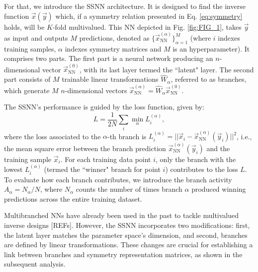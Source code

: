 
For that, we introduce the SSNN architecture. It is designed to find the inverse function $\vec{x} (\vec{y})$ which, if a symmetry relation presented in Eq. \eqref{eq:symmetry} holds, will be $K$-fold multivalued. This NN depicted in Fig. \ref{fig:FIG_1}, takes $\vec{y}$ as input and outputs $M$ predictions, denoted as $\{ \vec{x}^{(\alpha)}_{\mathrm{NN}} \}_{\alpha=1}^{M}$ (where $i$ indexes training samples, $\alpha$ indexes symmetry matrices and $M$ is an hyperparameter). It comprises two parts. The first part is a neural network producing an $n$-dimensional vector $\vec{x}^{(0)}_{\mathrm{NN}}$, with its last layer termed the ``latent" layer.  The second part consists of $M$ trainable linear transformations $\hat{W}_{\alpha}$, referred to as branches, which generate $M$ $n$-dimensional vectors $\vec{x}^{(\alpha)}_{\mathrm{NN}} = \hat{W}_{\alpha} \vec{x}^{(0)}_{\mathrm{NN}}$.


The SSNN's performance is guided by the loss function, given by:
\begin{equation}\label{eq:loss}
    L = \frac{1}{2N} \sum_i \min_{\alpha} L_i^{(\alpha)},
\end{equation}
where the loss associated to the $\alpha$-th branch is $L_i^{(\alpha)} = || \vec{x}_i - \vec{x}^{(\alpha)}_{\mathrm{NN}}(\vec{y}_i)||^2$, i.e., the mean square error between the branch prediction $\vec{x}^{(\alpha)}_{\mathrm{NN}}(\vec{y}_i)$ and the training sample $\vec{x}_i$.
For each training data point $i$, only the branch with the lowest $L_i^{(\alpha)}$ (termed the ``winner" branch for point $i$) contributes to the loss $L$.  To evaluate how each branch contributes, we introduce the branch activity $A_{\alpha} = N_{\alpha}/N$, where $N_{\alpha}$ counts the number of times branch $\alpha$ produced winning predictions across the entire training dataset.

Multibranched NNs have already been used in the past to tackle multivalued inverse designs [REFs]. However, the SSNN incorporates two modifications: first, the latent layer matches the parameter space's dimension, and second, branches are defined by linear transformations. These changes are crucial for establishing a link between branches and symmetry representation matrices, as shown in the subsequent analysis.
%

